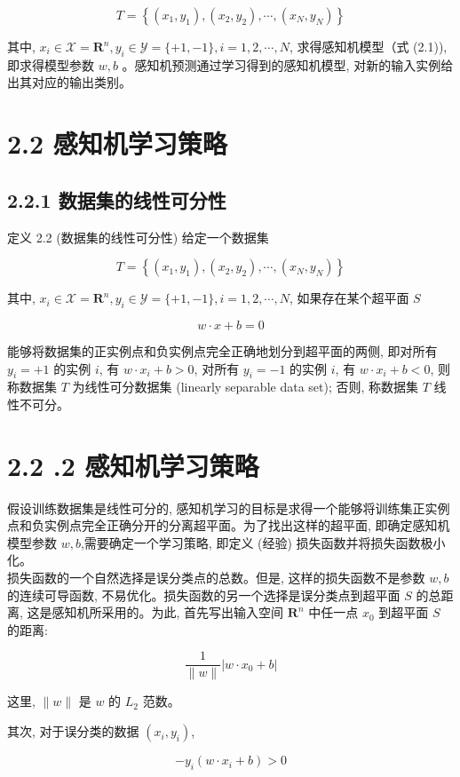 \documentclass[10pt]{article}
\begin{document}
$$
T=\left\{\left(x_{1}, y_{1}\right),\left(x_{2}, y_{2}\right), \cdots,\left(x_{N}, y_{N}\right)\right\}
$$

其中, $x_{i} \in \mathcal{X}=\boldsymbol{R}^{n}, y_{i} \in \mathcal{Y}=\{+1,-1\}, i=1,2, \cdots, N$, 求得感知机模型（式 (2.1)), 即求得模型参数 $w, b$ 。感知机预测通过学习得到的感知机模型, 对新的输入实例给出其对应的输出类别。

\section*{2.2 感知机学习策略}
\subsection*{2.2.1 数据集的线性可分性}
定义 2.2 (数据集的线性可分性) 给定一个数据集

$$
T=\left\{\left(x_{1}, y_{1}\right),\left(x_{2}, y_{2}\right), \cdots,\left(x_{N}, y_{N}\right)\right\}
$$

其中, $x_{i} \in \mathcal{X}=\boldsymbol{R}^{n}, y_{i} \in \mathcal{Y}=\{+1,-1\}, i=1,2, \cdots, N$, 如果存在某个超平面 $S$

$$
w \cdot x+b=0
$$

能够将数据集的正实例点和负实例点完全正确地划分到超平面的两侧, 即对所有 $y_{i}=+1$ 的实例 $i$, 有 $w \cdot x_{i}+b>0$, 对所有 $y_{i}=-1$ 的实例 $i$, 有 $w \cdot x_{i}+b<0$, 则称数据集 $T$ 为线性可分数据集 (linearly separable data set); 否则, 称数据集 $T$ 线性不可分。

\section*{2.2 .2 感知机学习策略}
假设训练数据集是线性可分的, 感知机学习的目标是求得一个能够将训练集正实例点和负实例点完全正确分开的分离超平面。为了找出这样的超平面, 即确定感知机模型参数 $w, b$,需要确定一个学习策略, 即定义 (经验) 损失函数并将损失函数极小化。\\
损失函数的一个自然选择是误分类点的总数。但是, 这样的损失函数不是参数 $w, b$ 的连续可导函数, 不易优化。损失函数的另一个选择是误分类点到超平面 $S$ 的总距离, 这是感知机所采用的。为此, 首先写出输入空间 $\boldsymbol{R}^{n}$ 中任一点 $x_{0}$ 到超平面 $S$ 的距离:

$$
\frac{1}{\|w\|}\left|w \cdot x_{0}+b\right|
$$

这里, $\|w\|$ 是 $w$ 的 $L_{2}$ 范数。

其次, 对于误分类的数据 $\left(x_{i}, y_{i}\right)$,

$$
-y_{i}\left(w \cdot x_{i}+b\right)>0
$$
\end{document}
